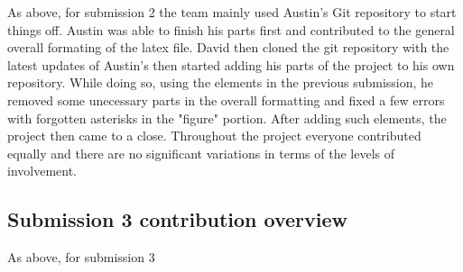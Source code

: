 \documentclass[a4paper, 11pt]{report}
\begin{document}
As above, for submission 2 the team mainly used Austin's Git repository to start things off. Austin was able to finish his parts first and contributed to the general overall formating of the latex file. David then cloned the git repository with the latest updates of Austin's then started adding his parts of the project to his own repository. While doing so, using the elements in the previous submission, he removed some unecessary parts in the overall formatting and fixed a few errors with forgotten asterisks in the "figure" portion. After adding such elements, the project then came to a close. Throughout the project everyone contributed equally and there are no significant variations in terms of the levels of involvement. 

\subsection{Submission 3 contribution overview}

As above, for submission 3



\newpage



\end{document}
